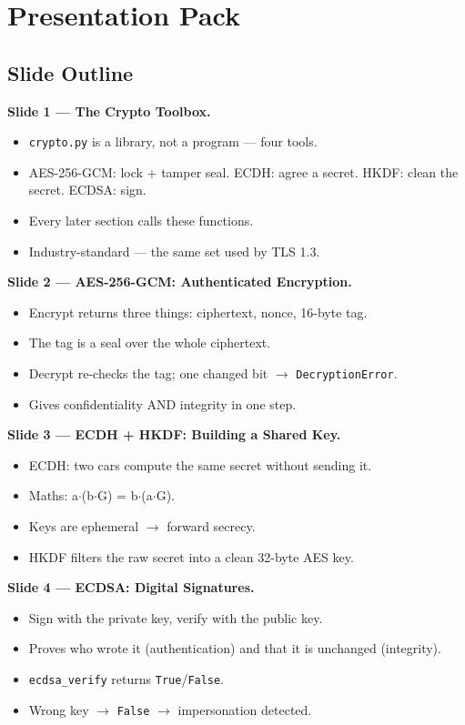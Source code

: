 \documentclass[11pt,a4paper]{report}
\begin{document}
\section{Presentation Pack}

\subsection{Slide Outline}

\textbf{Slide 1 --- The Crypto Toolbox.}
\begin{itemize}
  \item \texttt{crypto.py} is a library, not a program --- four tools.
  \item AES-256-GCM: lock + tamper seal. ECDH: agree a secret. HKDF: clean the
        secret. ECDSA: sign.
  \item Every later section calls these functions.
  \item Industry-standard --- the same set used by TLS 1.3.
\end{itemize}

\textbf{Slide 2 --- AES-256-GCM: Authenticated Encryption.}
\begin{itemize}
  \item Encrypt returns three things: ciphertext, nonce, 16-byte tag.
  \item The tag is a seal over the whole ciphertext.
  \item Decrypt re-checks the tag; one changed bit $\to$ \texttt{DecryptionError}.
  \item Gives confidentiality AND integrity in one step.
\end{itemize}

\textbf{Slide 3 --- ECDH + HKDF: Building a Shared Key.}
\begin{itemize}
  \item ECDH: two cars compute the same secret without sending it.
  \item Maths: a$\cdot$(b$\cdot$G) = b$\cdot$(a$\cdot$G).
  \item Keys are ephemeral $\to$ forward secrecy.
  \item HKDF filters the raw secret into a clean 32-byte AES key.
\end{itemize}

\textbf{Slide 4 --- ECDSA: Digital Signatures.}
\begin{itemize}
  \item Sign with the private key, verify with the public key.
  \item Proves who wrote it (authentication) and that it is unchanged (integrity).
  \item \texttt{ecdsa\_verify} returns \texttt{True}/\texttt{False}.
  \item Wrong key $\to$ \texttt{False} $\to$ impersonation detected.
\end{itemize}
\end{document}
